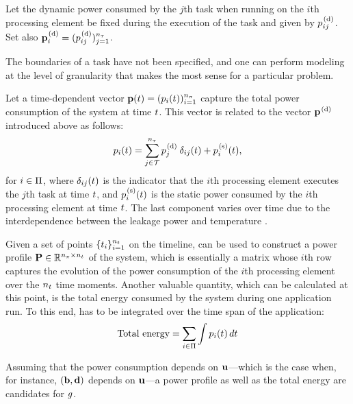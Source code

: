 Let the dynamic power consumed by the $j$th task when running on the $i$th
processing element be fixed during the execution of the task and given by
$p^{\text{\kern0.1em(d)}}_{ij}$. Set also $\mathbf{p}_i^{\text{\kern0.1em(d)}} = (p^{\text{\kern0.1em(d)}}_{ij})_{j =
1}^{{n_\tau}}$.

\begin{remark}
The boundaries of a task have not been specified, and one can perform modeling
at the level of granularity that makes the most sense for a particular problem.
\end{remark}

Let a time-dependent vector $\mathbf{p}(t) = (p_i(t))_{i = 1}^{{n_\pi}}$ capture the
total power consumption of the system at time $t$. This vector is related to
the vector $\mathbf{p}^{\text{\kern0.1em(d)}}$ introduced above as follows:
\begin{equation} \elab{power}
  \p_i(\t) = \sum_{j \in \tasks}^\nt \p^\dynamic_j \: \delta_{ij} (\t) + \p^\static_i(\t),
\end{equation}
for $i \in \Pi$, where $\delta_{ij}(t)$ is the indicator that the $i$th
processing element executes the $j$th task at time $t$, and $p^{\text{\kern0.1em(s)}}_i(t)$
is the static power consumed by the $i$th processing element at time $t$. The
last component varies over time due to the interdependence between the leakage
power and temperature \cite{liu2007}.

Given a set of points $\{ t_i \}_{i = 1}^{n_t}$ on the timeline,  can
be used to construct a power profile $\mathbf{P} \in \mathbb{R}^{{n_\pi} \times {n_t}}$ of the
system, which is essentially a matrix whose $i$th row captures the evolution of
the power consumption of the $i$th processing element over the ${n_t}$ time
moments. Another valuable quantity, which can be calculated at this point, is
the total energy consumed by the system during one application run. To this end,
 has to be integrated over the time span of the application:
\begin{equation} \elab{total-energy}
  \text{Total energy} = \sum_{i \in \procs} \int \p_i(\t) \, d\t
\end{equation}

Assuming that the power consumption depends on $\mathbf{u}$---which is the case when,
for instance, $(\mathbf{b}, \mathbf{d})$ depends on $\mathbf{u}$---a power profile as well as the
total energy are candidates for $g$.
